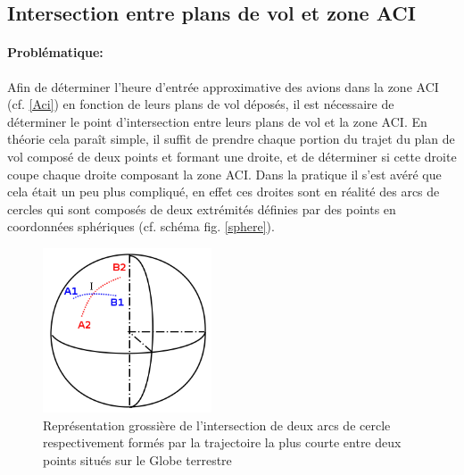     \subsection{Intersection entre plans de vol et zone ACI\label{mathcoord}}
            \paragraph{Problématique:}
Afin de déterminer l'heure d'entrée approximative des avions dans la zone ACI (cf. \vref{Aci}) en fonction de leurs plans de vol déposés, il est nécessaire de déterminer le point d'intersection entre leurs plans de vol et la zone ACI. En théorie cela paraît simple, il suffit de prendre chaque portion du trajet du plan de vol composé de deux points et formant une droite, et  de déterminer si cette droite coupe chaque droite composant la zone ACI. Dans la pratique il s'est avéré que cela était un peu plus compliqué, en effet ces droites sont en réalité des arcs de cercles qui sont composés de deux extrémités définies par des points en coordonnées sphériques (cf. schéma fig. \vref{sphere}).
\begin{figure}
    \center
    \includegraphics[width=5cm]{images/Sphere.png}
    \caption{Représentation grossière de l'intersection de deux arcs de cercle respectivement formés par la trajectoire la plus courte entre deux points situés sur le Globe terrestre}
    \label{sphere}
\end{figure}
